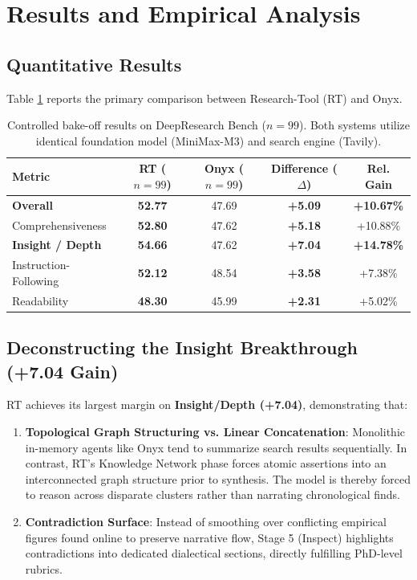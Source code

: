 \documentclass[11pt,a4paper]{article}
\begin{document}
\section{Results and Empirical Analysis}

\subsection{Quantitative Results}

Table \ref{tab:main_results} reports the primary comparison between Research-Tool (RT) and Onyx.

\begin{table}[ht]
\centering
\small
\caption{Controlled bake-off results on DeepResearch Bench ($n=99$). Both systems utilize identical foundation model (MiniMax-M3) and search engine (Tavily).}
\label{tab:main_results}
\begin{tabular}{lcccc}
\toprule
\textbf{Metric} & \textbf{RT ($n=99$)} & \textbf{Onyx ($n=99$)} & \textbf{Difference ($\Delta$)} & \textbf{Rel. Gain} \\
\midrule
\textbf{Overall} & \textbf{52.77} & 47.69 & \textbf{+5.09} & \textbf{+10.67\%} \\
Comprehensiveness & \textbf{52.80} & 47.62 & \textbf{+5.18} & +10.88\% \\
\textbf{Insight / Depth} & \textbf{54.66} & 47.62 & \textbf{+7.04} & \textbf{+14.78\%} \\
Instruction-Following & \textbf{52.12} & 48.54 & \textbf{+3.58} & +7.38\% \\
Readability & \textbf{48.30} & 45.99 & \textbf{+2.31} & +5.02\% \\
\bottomrule
\end{tabular}
\end{table}

\subsection{Deconstructing the Insight Breakthrough (+7.04 Gain)}

RT achieves its largest margin on \textbf{Insight/Depth (+7.04)}, demonstrating that:
\begin{enumerate}
    \item \textbf{Topological Graph Structuring vs. Linear Concatenation}: Monolithic in-memory agents like Onyx tend to summarize search results sequentially. In contrast, RT's Knowledge Network phase forces atomic assertions into an interconnected graph structure prior to synthesis. The model is thereby forced to reason across disparate clusters rather than narrating chronological finds.
    \item \textbf{Contradiction Surface}: Instead of smoothing over conflicting empirical figures found online to preserve narrative flow, Stage 5 (Inspect) highlights contradictions into dedicated dialectical sections, directly fulfilling PhD-level rubrics.
\end{enumerate}
\end{document}
